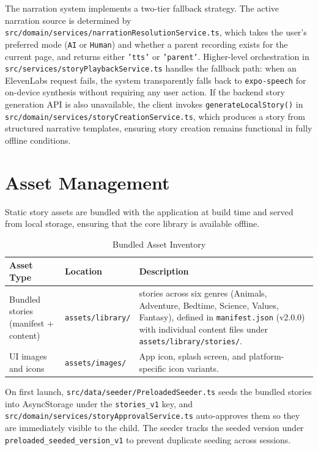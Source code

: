 The narration system implements a two-tier fallback strategy. The active narration source is determined by \texttt{src/domain/services/narrationResolutionService.ts}, which takes the user's preferred mode (\texttt{AI} or \texttt{Human}) and whether a parent recording exists for the current page, and returns either \texttt{'tts'} or \texttt{'parent'}. Higher-level orchestration in \texttt{src/services/storyPlaybackService.ts} handles the fallback path: when an ElevenLabs request fails, the system transparently falls back to \texttt{expo-speech} for on-device synthesis without requiring any user action. If the backend story generation API is also unavailable, the client invokes \texttt{generateLocalStory()} in \texttt{src/domain/services/storyCreationService.ts}, which produces a story from structured narrative templates, ensuring story creation remains functional in fully offline conditions.

\section{Asset Management}

Static story assets are bundled with the application at build time and served from local storage, ensuring that the core library is available offline.

\begin{table}[H]
\centering
\caption{Bundled Asset Inventory}
\label{tab:assets}
\renewcommand{\arraystretch}{1.4}
\begin{tabularx}{\textwidth}{|>{\RaggedRight\arraybackslash}p{4cm}|>{\RaggedRight\arraybackslash}p{3cm}|>{\RaggedRight\arraybackslash}X|}
\hline
\textbf{Asset Type} & \textbf{Location} & \textbf{Description} \\
\hline
Bundled stories (manifest + content) & \texttt{assets/library/} & 50 stories across six genres (Animals, Adventure, Bedtime, Science, Values, Fantasy), defined in \texttt{manifest.json} (v2.0.0) with individual content files under \texttt{assets/library/stories/}. \\
\hline
UI images and icons & \texttt{assets/images/} & App icon, splash screen, and platform-specific icon variants. \\
\hline
\end{tabularx}
\end{table}

On first launch, \texttt{src/data/seeder/PreloadedSeeder.ts} seeds the bundled stories into AsyncStorage under the \texttt{stories\_v1} key, and \texttt{src/domain/services/storyApprovalService.ts} auto-approves them so they are immediately visible to the child. The seeder tracks the seeded version under \texttt{preloaded\_seeded\_version\_v1} to prevent duplicate seeding across sessions.

